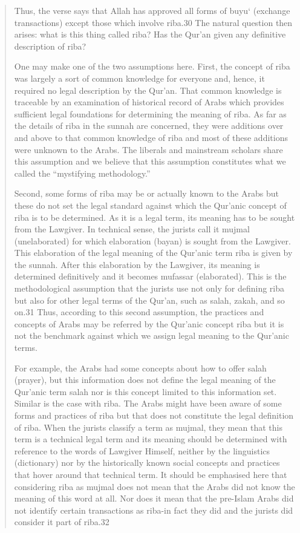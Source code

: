\begin{quote}
Thus, the verse says that Allah has approved all forms of buyu‘ (exchange transactions) except those which involve riba.30 The natural question then arises: what is this thing called riba? Has the Qur'an given any definitive description of riba?

One may make one of the two assumptions here. First, the concept of riba was largely a sort of common knowledge for everyone and, hence, it required no legal description by the Qur'an. That common knowledge is traceable by an examination of historical record of Arabs which provides sufficient legal foundations for determining the meaning of riba. As far as the details of riba in the sunnah are concerned, they were additions over and above to that common knowledge of riba and most of these additions were unknown to the Arabs. The liberals and mainstream scholars share this assumption and we believe that this assumption constitutes what we called the “mystifying methodology.”

Second, some forms of riba may be or actually known to the Arabs but these do not set the legal standard against which the Qur'anic concept of riba is to be determined. As it is a legal term, its meaning has to be sought from the Lawgiver. In technical sense, the jurists call it mujmal (unelaborated) for which elaboration (bayan) is sought from the Lawgiver. This elaboration of the legal meaning of the Qur'anic term riba is given by the sunnah. After this elaboration by the Lawgiver, its meaning is determined definitively and it becomes mufassar (elaborated). This is the methodological assumption that the jurists use not only for defining riba but also for other legal terms of the Qur'an, such as salah, zakah, and so on.31 Thus, according to this second assumption, the practices and concepts of Arabs may be referred by the Qur'anic concept riba but it is not the benchmark against which we assign legal meaning to the Qur'anic terms.

For example, the Arabs had some concepts about how to offer salah (prayer), but this information does not define the legal meaning of the Qur'anic term salah nor is this concept limited to this information set. Similar is the case with riba. The Arabs might have been aware of some forms and practices of riba but that does not constitute the legal definition of riba. When the jurists classify a term as mujmal, they mean that this term is a technical legal term and its meaning should be determined with reference to the words of Lawgiver Himself, neither by the linguistics (dictionary) nor by the historically known social concepts and practices that hover around that technical term. It should be emphasised here that considering riba as mujmal does not mean that the Arabs did not know the meaning of this word at all. Nor does it mean that the pre-Islam Arabs did not identify certain transactions as riba-in fact they did and the jurists did consider it part of riba.32


\end{quote}
